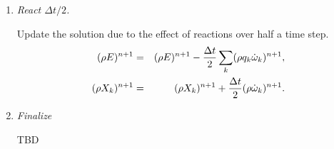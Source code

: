 \begin{enumerate}



\item {\em React $\Delta t/2$.}

Update the solution due to the effect of reactions over half a time step.
\begin{eqnarray}
(\rho E)^{n+1} &=& (\rho E)^{n+1} - \frac{\Delta t}{2}\sum_k(\rho q_k\dot\omega_k)^{n+1},\\
(\rho X_k)^{n+1} &=& (\rho X_k)^{n+1} + \frac{\Delta t}{2}(\rho\dot\omega_k)^{n+1}.
\end{eqnarray}


\item {\em Finalize}

TBD



\end{enumerate}

